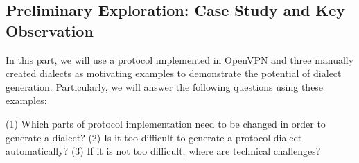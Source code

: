\subsection{Preliminary Exploration: Case Study and Key Observation}
\label{sec:openvpn}

In this part, we will use a protocol implemented in OpenVPN 
and three manually created dialects as motivating examples 
to demonstrate the potential of dialect generation. 
Particularly, we will answer the following questions using these examples:

(1) Which parts of protocol implementation need to be changed in order to generate a dialect?
(2) Is it too difficult to generate a protocol dialect automatically?
(3) If it is not too difficult, where are technical challenges?




